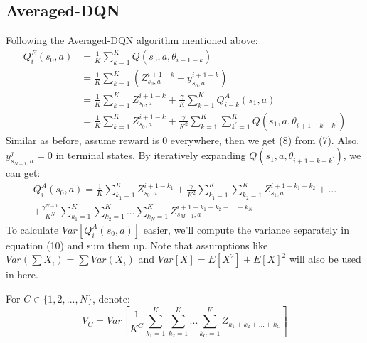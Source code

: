 \subsection{Averaged-DQN}
Following the Averaged-DQN algorithm mentioned above:
\begin{align}
Q^E_i(s_0,a)&=\frac{1}{K}\sum^K_{k=1}Q(s_0,a,\theta_{i+1-k})\\
            &=\frac{1}{K}\sum^K_{k=1}(Z^{i+1-k}_{s_{0},a}+y^{i+1-k}_{s_{0},a})\\
            &=\frac{1}{K}\sum^K_{k=1}Z^{i+1-k}_{s_{0},a}+\frac{\gamma}{K}\sum^K_{k=1}Q^A_{i-k}(s_{1},a)\\
            &=\frac{1}{K}\sum^K_{k=1}Z^{i+1-k}_{s_{0},a}+\frac{\gamma}{K^2}\sum^K_{k=1}\sum^K_{k^{'}=1}Q(s_{1},a,\theta_{i+1-k-k^{'}})
\end{align}
Similar as before, assume reward is 0 everywhere, then we get (8) from (7). Also,  \begin{math}y^{j}_{s_{N-1},a}=0\end{math} in terminal states. By iteratively expanding
\begin{math}Q(s_{1},a,\theta_{i+1-k-k^{'}})\end{math}, we can get:
\begin{equation}
\begin{aligned}
Q^A_{i}(s_{0},a) = \frac{1}{K}\sum^K_{k_{1}=1}Z^{i+1-k_{1}}_{s_{0},a}
+\frac{\gamma}{K^2}\sum^K_{k_{1}=1}\sum^K_{k_{2}=1}Z^{i+1-k_{1}-k_{2}}_{s_{1},a}
+...\\
+\frac{\gamma^{N-1}}{K^N}\sum^K_{k_{1}=1}\sum^K_{k_{2}=1}...\sum^K_{k_{N}=1}Z^{i+1-k_{1}-k_{2}-...-k_{N}}_{s_{M-1},a}
\end{aligned}
\end{equation}
To calculate \begin{math}Var[Q^A_{i}(s_{0},a)]\end{math} easier, we'll compute the variance separately in equation (10) and sum them up. Note that assumptions like \begin{math}Var(\sum X_i)=\sum Var(X_i)\end{math} and \begin{math}Var[X]=E[X^{2}]+E[X]^2\end{math} will also be used in here.
\par For \begin{math}C\in \{1,2,...,N\}\end{math}, denote:
\begin{equation}
V_C = Var[\frac{1}{K^C}\sum^K_{k_{1}=1}\sum^K_{k_{2}=1}...\sum^K_{k_{C}=1}Z_{k_{1}+k_{2}+...+k_{C}}]
\end{equation}
